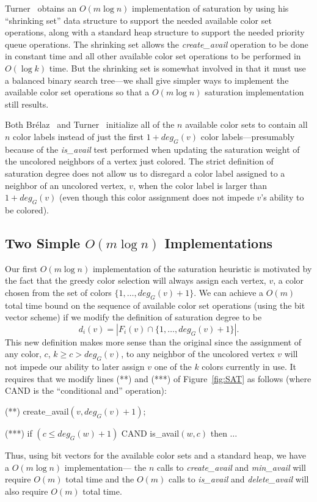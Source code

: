 Turner~\cite{TUR1988} obtains an $O(m \log n)$ implementation
of saturation by using his ``shrinking set'' data structure to
support the needed available color set operations, along with a standard heap
structure to support the needed priority queue operations. 
The shrinking set allows the {\em create\_avail\/} operation to be done in 
constant time and all other available color set operations to be performed 
in $O(\log k)$ time. But the shrinking set is somewhat involved
in that it must use a balanced binary search tree---we shall give simpler 
ways to implement the available color set operations so that 
a $O(m \log n)$ saturation implementation still results.  

Both Br\'{e}laz~\cite{BRE1979} and Turner~\cite{TUR1988} initialize all of 
the $n$ available color sets to contain all $n$ color labels instead of just 
the first $1+deg_G(v)$ color labels---presumably because of the 
{\em is\_avail\/} test performed when updating the saturation weight
of the uncolored neighbors of a vertex just colored.  The strict definition of 
saturation degree does not allow us to disregard a color label assigned 
to a neighbor of an uncolored vertex, $v$, when the color label is larger 
than $1+deg_G(v)$ (even though this color assignment does not impede $v$'s 
ability to be colored). 

\subsection{Two Simple $O(m \log n)$ Implementations}
Our first $O(m \log n)$ implementation of the saturation heuristic
is motivated by the fact that the greedy color selection will always assign each
vertex, $v$, a color chosen from the set of colors 
$\{1, \ldots, deg_G(v) + 1\}$.  We can achieve a $O(m)$ total time bound on 
the sequence of available color set operations (using the bit vector scheme) 
if we modify the definition of saturation degree to be 
\[
d_i(v) = \left| F_i(v) \cap \{1, \ldots, deg_G(v) + 1\} \right|.
\]
This new definition makes more sense than the original since the assignment 
of any color, $c$, $k \geq c > deg_G(v)$, to any neighbor of the uncolored 
vertex $v$ will not impede our ability to later assign $v$ one of the 
$k$ colors currently in use.  It requires that we modify lines (**) and (***) 
of Figure~\ref{fig:SAT} as follows (where CAND is the ``conditional and'' 
operation):
\begin{list}{}
   {\setlength{\labelwidth}{1.0in}
    \setlength{\leftmargin}{1.0in}
    \setlength{\rightmargin}{0in}
    \setlength{\labelsep}{0in}
   }
\item[(**)\hfill] create\_avail$(v, deg_G(v) +1)$;
\item[(***)\hfill] if $(c \leq deg_G(w) +1)$ CAND is\_avail$(w,c)$ then $\ldots$
\end{list}
Thus, using bit vectors for the available color sets and a standard heap, we
have a $O(m \log n)$ implementation---
the $n$ calls to {\em create\_avail} and {\em min\_avail} will
require $O(m)$ total time and the $O(m)$ calls to {\em is\_avail} and 
{\em delete\_avail} will also require $O(m)$ total time.

